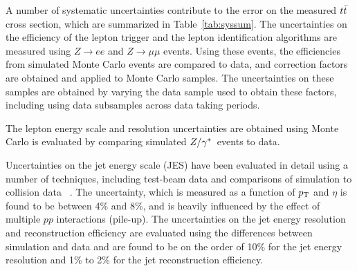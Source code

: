 A number of systematic uncertainties contribute to the error on the measured $t\bar{t}$ cross section,
which are summarized in Table~\ref{tab:syssum}.
The uncertainties on the efficiency of the lepton trigger and the lepton identification algorithms
are measured using $Z\rightarrow ee$ and $Z\rightarrow\mu\mu$ events.
Using these events, the efficiencies from simulated Monte Carlo events are compared to data,
and correction factors are obtained and applied to Monte Carlo samples.
The uncertainties on these samples are obtained by varying the data sample used to obtain
these factors, including using data subsamples across data taking periods.


The lepton energy scale and resolution uncertainties are obtained using Monte Carlo is evaluated
by comparing simulated $Z/\gamma^{*}$\ events to data.


Uncertainties on the jet energy scale (JES) have been evaluated in detail using
a number of techniques, including test-beam data and comparisons of simulation
to collision data ~\cite{Aad:2011he}.
The uncertainty, which is measured as a function of $p_{\mathrm{T}}$ and $\eta$
is found to be between 4\% and 8\%, and is heavily influenced by the effect
of multiple $pp$ interactions (pile-up).
The uncertainties on the jet energy resolution and reconstruction efficiency are evaluated using the
differences between simulation and data and are found to be on the order of 10\% for the 
jet energy resolution and 1\% to 2\% for the jet reconstruction efficiency.

